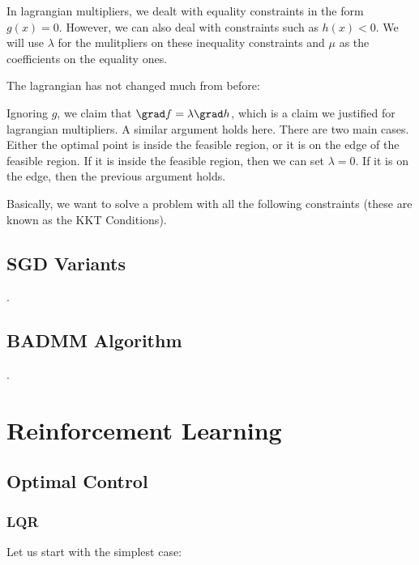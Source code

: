 \documentclass[12pt]{article}
\begin{document}
In lagrangian multipliers, we dealt with equality constraints in the form $g(x) = 0$. However, we can also deal with constraints such as $h(x) < 0$. We will use $\lambda$ for the mulitpliers on these inequality constraints and $\mu$ as the coefficients on the equality ones.

The lagrangian has not changed much from before:


Ignoring $g$, we claim that $\grad f = \lambda \grad h$, which is a claim we justified for lagrangian multipliers. A similar argument holds here. There are two main cases. Either the optimal point is inside the feasible region, or it is on the edge of the feasible region. If it is inside the feasible region, then we can set $\lambda = 0$. If it is on the edge, then the previous argument holds.

Basically, we want to solve a problem with all the following constraints (these are known as the KKT Conditions). 


\subsection{SGD Variants}
.
\subsection{BADMM Algorithm}
.
\section{Reinforcement Learning}

\subsection{Optimal Control}

\subsubsection{LQR}

Let us start with the simplest case:

\end{document}

